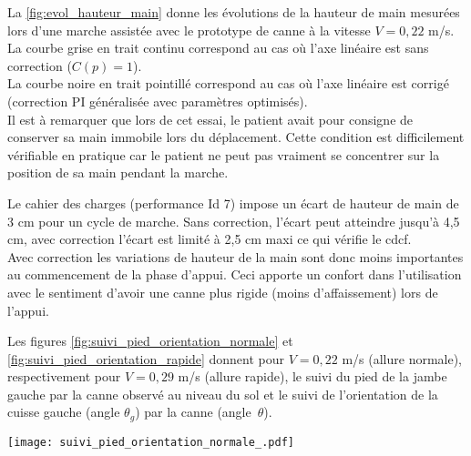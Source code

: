 \begin{multicols}{2}
La \ref{fig:evol_hauteur_main} donne les évolutions de la hauteur de main mesurées lors d'une marche assistée avec le prototype de canne à la vitesse $V = 0,22$ m/s.\\ La courbe grise en trait continu correspond au cas où l'axe linéaire est sans correction ($C(p) = 1$).\\ La courbe noire en trait pointillé correspond au cas où l'axe linéaire est corrigé (correction PI généralisée avec paramètres optimisés). \\Il est à remarquer que lors de cet essai, le patient avait pour consigne de conserver sa main immobile lors du déplacement. Cette condition est difficilement vérifiable en pratique car le patient ne peut pas vraiment se concentrer sur la position de sa main pendant la marche.
\vspace{1em}
\fi


\ifprof
\begin{corrige}
Le cahier des charges (performance Id 7) impose un écart de hauteur de main de 3 cm pour un cycle de marche. Sans correction, l'écart peut atteindre jusqu'à 4,5 cm, avec correction l'écart est limité à 2,5 cm maxi ce qui vérifie le cdcf.\\
Avec correction les variations de hauteur de la main sont donc moins importantes au commencement de la phase d'appui. Ceci apporte un confort dans l'utilisation avec le sentiment d'avoir une canne plus rigide (moins d'affaissement) lors de l'appui.
\end{corrige}
\fi


\ifprof
\else
\vspace{1em}
Les figures \ref{fig:suivi_pied_orientation_normale} et \ref{fig:suivi_pied_orientation_rapide} donnent pour $V = 0,22$ m/s (allure normale), respectivement pour $V = 0,29$ m/s (allure rapide), le suivi du pied de la jambe gauche par la canne observé au niveau du sol et le suivi de l'orientation de la cuisse gauche (angle $\theta_g$) par la canne (angle~$\theta$).


\begin{center}%
\texttt{[image: suivi\_pied\_orientation\_normale\_.pdf]}
\end{center}


\end{multicols}
